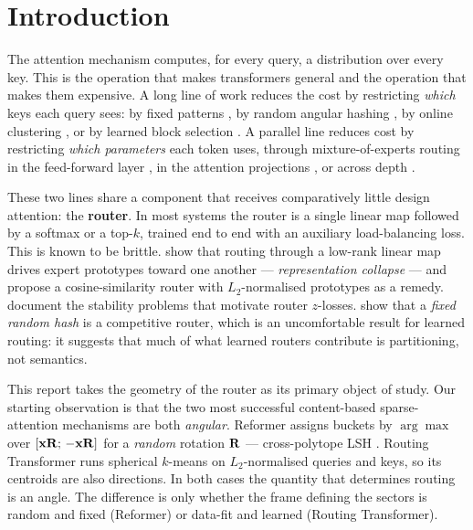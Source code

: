 \section{Introduction}

The attention mechanism \citep{vaswani2017attention} computes, for every query, a distribution over every key. This is the operation that makes transformers general and the operation that makes them expensive. A long line of work reduces the cost by restricting \emph{which} keys each query sees: by fixed patterns \citep{child2019sparse,beltagy2020longformer,zaheer2020bigbird}, by random angular hashing \citep{kitaev2020reformer}, by online clustering \citep{roy2021routing}, or by learned block selection \citep{yuan2025nsa,lu2025moba}. A parallel line reduces cost by restricting \emph{which parameters} each token uses, through mixture-of-experts routing in the feed-forward layer \citep{shazeer2017outrageously,fedus2022switch,lepikhin2021gshard}, in the attention projections \citep{zhang2022moa,csordas2024switchhead,jin2025moh}, or across depth \citep{raposo2024mixture}.

These two lines share a component that receives comparatively little design attention: the \textbf{router}. In most systems the router is a single linear map followed by a softmax or a top-$k$, trained end to end with an auxiliary load-balancing loss. This is known to be brittle. \citet{chi2022representation} show that routing through a low-rank linear map drives expert prototypes toward one another --- \emph{representation collapse} --- and propose a cosine-similarity router with $L_2$-normalised prototypes as a remedy. \citet{zoph2022stmoe} document the stability problems that motivate router $z$-losses. \citet{roller2021hash} show that a \emph{fixed random hash} is a competitive router, which is an uncomfortable result for learned routing: it suggests that much of what learned routers contribute is partitioning, not semantics.

This report takes the geometry of the router as its primary object of study. Our starting observation is that the two most successful content-based sparse-attention mechanisms are both \emph{angular}. Reformer assigns buckets by $\arg\max$ over $[\mathbf{x} \mathbf{R};\, -\mathbf{x} \mathbf{R}]$ for a \emph{random} rotation $\mathbf{R}$ --- cross-polytope LSH \citep{andoni2015crosspolytope,charikar2002simhash}. Routing Transformer runs spherical $k$-means on $L_2$-normalised queries and keys, so its centroids are also directions. In both cases the quantity that determines routing is an angle. The difference is only whether the frame defining the sectors is random and fixed (Reformer) or data-fit and learned (Routing Transformer).

